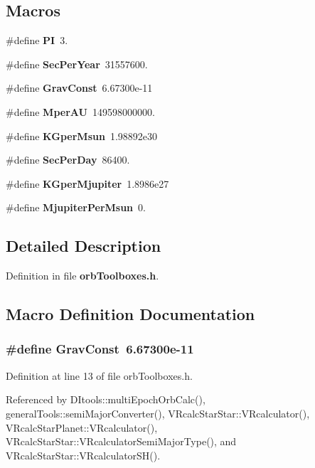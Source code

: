 \subsection*{Macros}
\begin{DoxyCompactItemize}
\item 
\#define {\bf P\-I}~3.
\item 
\#define {\bf Sec\-Per\-Year}~31557600.
\item 
\#define {\bf Grav\-Const}~6.\-67300e-\/11
\item 
\#define {\bf Mper\-A\-U}~149598000000.
\item 
\#define {\bf K\-Gper\-Msun}~1.\-98892e30
\item 
\#define {\bf Sec\-Per\-Day}~86400.
\item 
\#define {\bf K\-Gper\-Mjupiter}~1.\-8986e27
\item 
\#define {\bf Mjupiter\-Per\-Msun}~0.
\end{DoxyCompactItemize}


\subsection{Detailed Description}


Definition in file {\bf orb\-Toolboxes.\-h}.



\subsection{Macro Definition Documentation}
\subsubsection[{Grav\-Const}]{\setlength{\rightskip}{0pt plus 5cm}\#define Grav\-Const~6.\-67300e-\/11}\label{orb_toolboxes_8h_acb874917124e80c2cc3093224267270a}


Definition at line 13 of file orb\-Toolboxes.\-h.



Referenced by D\-Itools\-::multi\-Epoch\-Orb\-Calc(), general\-Tools\-::semi\-Major\-Converter(), V\-Rcalc\-Star\-Star\-::\-V\-Rcalculator(), V\-Rcalc\-Star\-Planet\-::\-V\-Rcalculator(), V\-Rcalc\-Star\-Star\-::\-V\-Rcalculator\-Semi\-Major\-Type(), and V\-Rcalc\-Star\-Star\-::\-V\-Rcalculator\-S\-H().

